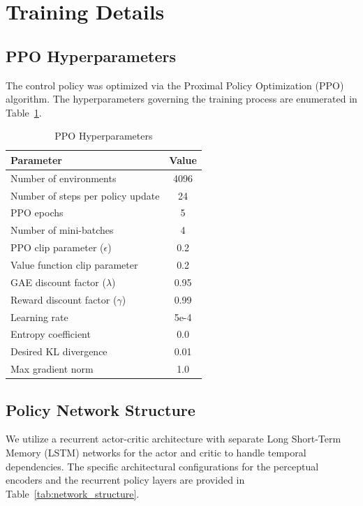 \clearpage
\appendix
\section{Training Details}

\subsection{PPO Hyperparameters}
The control policy was optimized via the Proximal Policy Optimization (PPO) algorithm. The hyperparameters governing the training process are enumerated in Table~\ref{tab:ppo_params}.

\begin{table}[h!]
\centering
\caption{PPO Hyperparameters}
\label{tab:ppo_params}
\begin{tabular}{lc}
\toprule
\textbf{Parameter} & \textbf{Value} \\
\midrule
Number of environments & 4096 \\
Number of steps per policy update & 24 \\
PPO epochs & 5 \\
Number of mini-batches & 4 \\
PPO clip parameter ($\epsilon$) & 0.2 \\
Value function clip parameter & 0.2 \\
GAE discount factor ($\lambda$) & 0.95 \\
Reward discount factor ($\gamma$) & 0.99 \\
Learning rate & 5e-4 \\
Entropy coefficient & 0.0 \\
Desired KL divergence & 0.01 \\
Max gradient norm & 1.0 \\
\bottomrule
\end{tabular}
\end{table}

\subsection{Policy Network Structure}
We utilize a recurrent actor-critic architecture with separate Long Short-Term Memory (LSTM) networks for the actor and critic to handle temporal dependencies. The specific architectural configurations for the perceptual encoders and the recurrent policy layers are provided in Table~\ref{tab:network_structure}.

